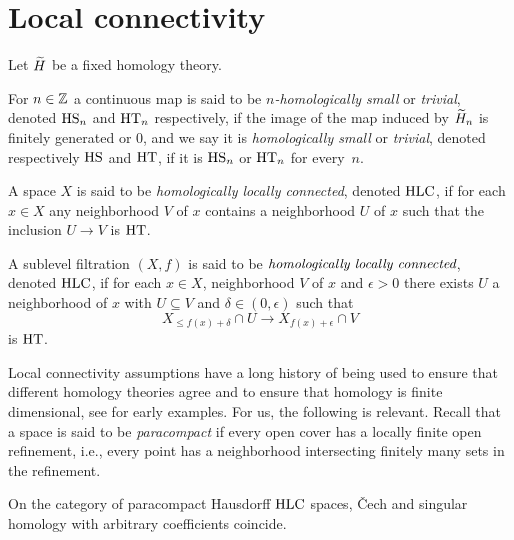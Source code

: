 
\section{Local connectivity}

Let $\widetilde{H}$ be a fixed homology theory.

\begin{defi} \label{defi:local_connectedness}
	For $n \in \mathbb{Z}$ a continuous map is said to be \textit{$n$-homologically small} or \textit{trivial}, denoted $\mathrm{HS}_n$ and $\mathrm{HT}_n$ respectively, if the image of the map induced by $\widetilde{H}_n$ is finitely generated or 0, and we say it is \textit{homologically small} or \textit{trivial}, denoted respectively $\mathrm{HS}$ and $\mathrm{HT}$, if it is $\mathrm{HS}_n$ or $\mathrm{HT}_n$ for every~$n$.
\end{defi}

\begin{defi}
	A space $X$ is said to be \emph{homologically locally connected}, denoted $\mathrm{HLC}$, if for each $x \in X$ any neighborhood $V$ of $x$ contains a neighborhood $U$ of $x$ such that the inclusion $U \to V$ is $\mathrm{HT}$.
	
	A sublevel filtration $(X,f)$ is said to be $\emph{homologically locally connected}$, denoted $\mathrm{HLC}$, if for each $x \in X$, neighborhood $V$ of $x$ and $\epsilon > 0$ there exists $U$ a neighborhood of $x$ with $U \subseteq V$ and $\delta \in (0, \epsilon)$ such that
	\begin{equation*}
	X_{\leq f(x) + \delta} \cap U \to X_{f(x) + \epsilon} \cap V
	\end{equation*}
	is $\mathrm{HT}$.
\end{defi}


Local connectivity assumptions have a long history of being used to ensure that different homology theories agree and to ensure that homology is finite dimensional, see \cite{MR0007094} for early examples.
For us, the following is relevant.
Recall that a space is said to be \textit{paracompact} if every open cover has a locally finite open refinement, i.e., every point has a neighborhood intersecting finitely many sets in the refinement.

\begin{prop}[{\cite{MR105677, MR1481706}}]\label{prop:cech_sing_hom_hlc}
	On the category of paracompact Hausdorff $\mathrm{HLC}$ spaces, \v{C}ech and singular homology with arbitrary coefficients coincide.
\end{prop}

